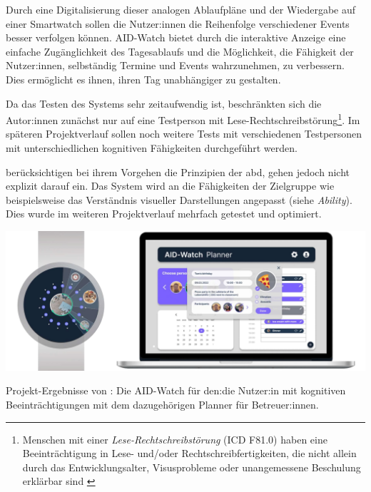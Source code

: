 \documentclass[sigchi-a,screen,nonacm,language=german]{acmart}
\theoremstyle{acmdefinition}
\begin{document}
Durch eine Digitalisierung dieser analogen Ablaufpläne und der Wiedergabe auf einer Smartwatch sollen die Nutzer:innen die Reihenfolge verschiedener Events besser verfolgen können. AID-Watch bietet durch die interaktive Anzeige eine einfache Zugänglichkeit des Tagesablaufs und die Möglichkeit, die Fähigkeit der Nutzer:innen, selbständig Termine und Events wahrzunehmen, zu verbessern. Dies ermöglicht es ihnen, ihren Tag unabhängiger zu gestalten.

Da das Testen des Systems sehr zeitaufwendig ist, beschränkten sich die Autor:innen zunächst nur auf eine Testperson mit Lese-Rechtschreibstörung\footnote{Menschen mit einer \emph{Lese-Rechtschreibstörung} (ICD F81.0) haben eine Beeinträchtigung in Lese- und/oder Rechtschreibfertigkeiten, die nicht allein durch das Entwicklungsalter, Visusprobleme oder unangemessene Beschulung erklärbar sind \citep{bmg:icd-code}}.
Im späteren Projektverlauf sollen noch weitere Tests mit verschiedenen Testpersonen mit unterschiedlichen kognitiven Fähigkeiten durchgeführt werden.

\citet{Schneider:2022:Aid-watch} berücksichtigen bei ihrem Vorgehen die Prinzipien der \ac{abd}, gehen jedoch nicht explizit darauf ein.
Das System wird an die Fähigkeiten der Zielgruppe wie beispielsweise das Verständnis visueller Darstellungen angepasst (siehe \emph{Ability}). Dies wurde im weiteren Projektverlauf mehrfach getestet und optimiert. 

\begin{marginfigure}
    \centering

    \includegraphics[width=\linewidth]{media/kuon2022_AID-Watch.jpg}

    \caption{Projekt-Ergebnisse von \citet{Schneider:2022:Aid-watch}: Die AID-Watch für den:die Nutzer:in mit kognitiven Beeinträchtigungen mit dem dazugehörigen Planner für Betreuer:innen.}
    \label{fig:schneider2022}
\end{marginfigure}
\end{document}
